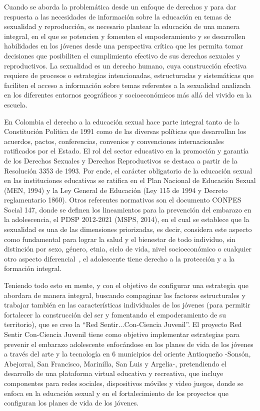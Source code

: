 \documentclass[journal,transmag]{IEEEtran}
\begin{document}
Cuando se aborda la problemática desde un enfoque de derechos y para dar respuesta a las necesidades de información sobre la educación en temas de sexualidad y reproducción, es necesario plantear la educación de una manera integral, en el que se potencien y fomenten el empoderamiento y se desarrollen habilidades en los jóvenes desde una perspectiva crítica que les permita tomar decisiones que posibiliten el cumplimiento efectivo de sus derechos sexuales y reproductivos. La sexualidad es un derecho humano, cuya construcción efectiva requiere de procesos o estrategias intencionadas, estructuradas y sistemáticas que faciliten el acceso a información sobre temas referentes a la sexualidad analizada en los diferentes entornos geográficos y socioeconómicos más allá del vivido en la escuela.

En Colombia el derecho a la educación sexual hace parte integral tanto de la Constitución Política de 1991 como de las diversas políticas que desarrollan los acuerdos, pactos, conferencias, convenios y convenciones internacionales ratificados por el Estado. El rol del sector educativo en la promoción y garantía de los Derechos Sexuales y Derechos Reproductivos se destaca a partir de la Resolución 3353 de 1993. Por ende, el carácter obligatorio de la educación sexual en las instituciones educativas se ratifica en el Plan Nacional de Educación Sexual (MEN, 1994) y la Ley General de Educación (Ley  115  de 1994 y Decreto reglamentario 1860). Otros referentes normativos son el documento CONPES Social 147, donde se definen los lineamientos para la prevención del embarazo en la adolescencia, el PDSP 2012-2021 (MSPS, 2014), en el cual  se  establece que la sexualidad es una de las dimensiones priorizadas, es decir, considera este aspecto como fundamental para lograr la salud y el bienestar de todo individuo, sin distinción por sexo, género, etnia, ciclo de vida, nivel socioeconómico o cualquier otro aspecto diferencial~\cite{Pro2015II}, el adolescente tiene derecho a la protección y a la formación integral.

Teniendo todo esto en mente, y con el objetivo de configurar una estrategia que abordara de manera integral, buscando compaginar los factores estructurales y trabajar también en las características individuales de los jóvenes (para permitir fortalecer la construcción del ser y fomentando el empoderamiento de su territorio), que se creo la ``Red Sentir...Con-Ciencia Juvenil''. El proyecto Red Sentir Con-Ciencia Juvenil tiene como objetivo implementar estrategias para prevenir el embarazo adolescente enfocándose en los planes de vida de los jóvenes a través del arte y la tecnología en 6 municipios del oriente Antioqueño -Sonsón, Abejorral, San Francisco, Marinilla, San Luis y Argelia-, pretendiendo el desarrollo de una plataforma virtual educativa y recreativa, que incluye componentes para redes sociales, dispositivos móviles y video juegos, donde se enfoca en la educación sexual y en el fortalecimiento de los proyectos que configuran los planes de vida de los jóvenes.
\end{document}
